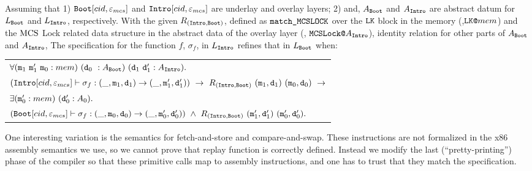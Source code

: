  \begin{theorem}
 \label{thm:chapter:mcslock:machine-state-refinement-full} 
Assuming that 
 1) ${{\mathrm{\texttt{Boot}}}}[cid, {\varepsilon}_{mcs}]$ and ${{\mathrm{\texttt{Intro}}}}[cid, {\varepsilon}_{mcs}]$ are underlay and overlay layers;
2) and, $A_{{\mathrm{\texttt{Boot}}}}$ and $A_{{\mathrm{\texttt{Intro}}}}$ are abstract datum for $L_{{\mathrm{\texttt{Boot}}}}$ and $L_{{\mathrm{\texttt{Intro}}}}$, respectively.
    With the given $R_{({\mathrm{\texttt{Intro}}}, {\mathrm{\texttt{Boot}}})}$, defined as ${\mathrm{\texttt{match\_MCSLOCK}}}$
     over the ${\mathrm{\texttt{LK}}}$ block in the memory  (\ie,${\mathrm{\texttt{LK}}}{\mathrm{\texttt{@}}}mem$) and 
the $\mathrm{MCS}$ Lock related data structure in the abstract data of the overlay layer (\ie, ${\mathrm{\texttt{MCSLock}}}{\mathrm{\texttt{@}}}A_{{\mathrm{\texttt{Intro}}}}$), 
 identity relation for other parts of $A_{{\mathrm{\texttt{Boot}}}}$ and $A_{{\mathrm{\texttt{Intro}}}}$, 
 The specification for the function $f$, $\sigma_f$, in $L_{{\mathrm{\texttt{Intro}}}}$ refines that in $L_{{\mathrm{\texttt{Boot}}}}$ when:
 \begin{center}
 \begin{tabular}{P{0.95\textwidth}}
$ \forall (\codeinmath{{m}}_{1} \ \codeinmath{{m}}_{1}'\ \codeinmath{{m}}_{0} : mem)\  (\codeinmath{{d}}_{0} \ : A_{\mmcsboot})\ (\codeinmath{{d}}_{1} \ \codeinmath{{d}}_{1}' : A_{\mmcslockintro}). $ \\
 $ (\mmcslockintro[cid, \oracle_{mcs}] \vdash \sigma_f : (\_, \codeinmath{m}_1, \codeinmath{d}_1) \rightarrow (\_, \codeinmath{m}_1', \codeinmath{d}_1'))  \ \rightarrow \
  R_{(\mmcslockintro, \mmcsboot)}\ (\codeinmath{{m}}_1, \codeinmath{{d}}_1)\ (\codeinmath{{m}}_0, \codeinmath{{d}}_0) \ \rightarrow $\\
  $ \exists ({\mathrm{\texttt{{m}}}}_{0}' : mem)\ ({\mathrm{\texttt{{d}}}}_{0}' : A_0).$ \\
$({{\mathrm{\texttt{Boot}}}}[cid, {\varepsilon}_{mcs}]  \vdash \sigma_f : (\_, {\mathrm{\texttt{m}}}_0, {\mathrm{\texttt{d}}}_0) \rightarrow (\_, {\mathrm{\texttt{m}}}_0', {\mathrm{\texttt{d}}}_0')) \ \wedge \
  R_{({\mathrm{\texttt{Intro}}}, {\mathrm{\texttt{Boot}}})}\ ({\mathrm{\texttt{{m}}}}'_1, {\mathrm{\texttt{{d}}}}'_1)\ ({\mathrm{\texttt{{m}}}}'_0, {\mathrm{\texttt{{d}}}}'_0).$  \\
 \end{tabular}
 \end{center}
 \end{theorem}


One interesting variation is the semantics
for fetch-and-store and compare-and-swap. These instructions are not
formalized in the x86 assembly semantics we use, so we cannot prove
that replay function is correctly defined. Instead we modify the last
(``pretty-printing'') phase of the compiler so that these primitive calls map to assembly
instructions, and one has to trust that they match the specification.

